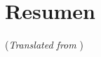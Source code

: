 %
%
\chapter{Resumen}
\vspace*{-1cm}


\vfill

{\small \noindent (\emph{Translated from })}
%
%
%
%
%
%
